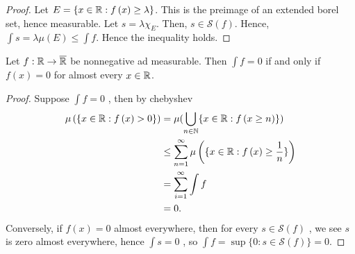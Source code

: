 \begin{proof}
	Let \(E = \{x \in \mathbb{R} : f\left( x \right)  \ge \lambda\}\). This is the preimage of an extended borel set, hence measurable. Let \(s = \lambda \chi_{E}\). Then, \(s \in \mathscr{S}\left( f \right) \). Hence, \(\int s = \lambda \mu\left( E \right) \le \int f \). Hence the inequality holds.
\end{proof}
\begin{theorem}
	Let \(f: \mathbb{R} \to \overline{\mathbb{R}}\)  be nonnegative ad measurable. Then \(\int f = 0\) if and only if \(f\left( x \right) = 0\) for almost every \(x \in \mathbb{R}\).
\end{theorem}
\begin{proof}
	Suppose \(\int f = 0\) , then by chebyshev \begin{align*}
		\mu\left( \{x \in \mathbb{R} : f\left( x \right)  > 0\}  \right) &= \mu (\bigcup_{n \in \mathbb{N}} \{x \in \mathbb{R} : f\left( x \ge n \right) \}  ) \\
									 &\le \sum_{n=1}^{\infty} \mu\left( \{ x\in \mathbb{R} : f\left( x \right)  \ge \frac{1}{n}\}  \right) \\
									 &= \sum_{i= 1}^{\infty} \int f \\
									 &= 0
	.\end{align*}
	Conversely, if \(f\left( x \right)  = 0\) almost everywhere, then for every \(s \in \mathscr{S}\left( f \right) \) , we see \(s\) is zero almost everywhere, hence \(\int s = 0\) , so \(\int f = \sup \{ 0 : s \in \mathscr{S}\left( f \right)  \}  = 0\).
\end{proof}
